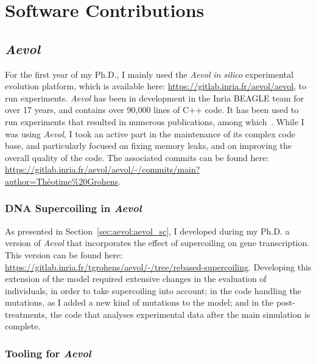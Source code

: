 \chapter{Software Contributions}
\label{chap:soft}

\section{\emph{Aevol}}

For the first year of my Ph.D., I mainly used the \emph{Aevol} \emph{in silico} experimental evolution platform, which is available here: \url{https://gitlab.inria.fr/aevol/aevol}, to run experiments.
\emph{Aevol} has been in development in the Inria BEAGLE team for over 17 years, and contains over 90,000 lines of C++ code.
It has been used to run experiments that resulted in numerous publications, among which~\cite{knibbe2005,batut2013,rutten2019}.
While I was using \emph{Aevol}, I took an active part in the maintenance of its complex code base, and particularly focused on fixing memory leaks, and on improving the overall quality of the code.
The associated commits can be found here: \url{https://gitlab.inria.fr/aevol/aevol/-/commits/main?author=Théotime%20Grohens}.

\subsection{DNA Supercoiling in \emph{Aevol}}

As presented in Section~\ref{sec:aevol:aevol_sc}, I developed during my Ph.D. a version of \emph{Aevol} that incorporates the effect of supercoiling on gene transcription.
This version can be found here: \url{https://gitlab.inria.fr/tgrohens/aevol/-/tree/rebased-supercoiling}.
Developing this extension of the model required extensive changes in the evaluation of individuals, in order to take supercoiling into account; in the code handling the mutations, as I added a new kind of mutations to the model; and in the post-treatments, the code that analyses experimental data after the main simulation is complete.

\subsection{Tooling for \emph{Aevol}}

